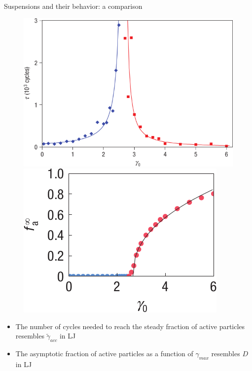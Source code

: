 \documentclass[compress]{beamer}
\begin{document}
	\begin{frame}{Suspensions and their behavior: a comparison}
	
		\begin{figure}
			\includegraphics[scale = 0.22]{Graphics/Literature/Relaxation}	
			\hspace{1cm}
			\onslide<2->
			\includegraphics[scale = 0.25]{Graphics/Literature/Active}	
		\end{figure}
		
		
		\begin{itemize}
			\item<1-> The number of cycles needed to reach the steady fraction of active particles resembles $\widetilde \gamma_{acc}$  in LJ
			\item<2-> The asymptotic fraction of active particles as a function of $\gamma_{max}$ resembles $D$ in LJ
		\end{itemize}
		
	\end{frame}
	
\end{document}

